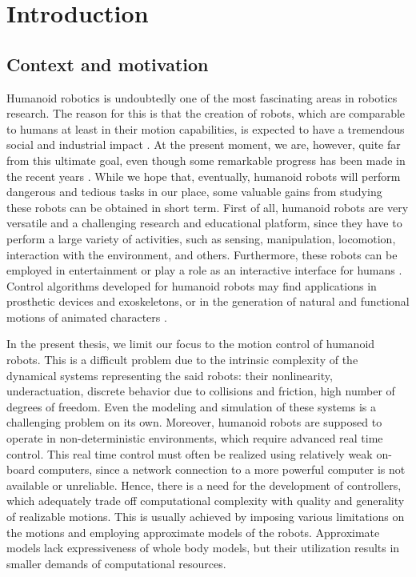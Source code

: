 \chapter{Introduction}
\label{ch.intro}
\acresetall

\section{Context and motivation}

Humanoid robotics is undoubtedly one of the most fascinating areas in robotics
research. The reason for this is that the creation of robots, which are
comparable to humans at least in their motion capabilities, is expected to have
a tremendous social and industrial impact \cite{Kemp2008handbook}. At the
present moment, we are, however, quite far from this ultimate goal, even though
some remarkable progress has been made in the recent years \cite{DRCsite}.
While we hope that, eventually, humanoid robots will perform dangerous and
tedious tasks in our place, some valuable gains from studying these robots can
be obtained in short term. First of all, humanoid robots are very versatile and
a challenging research and educational platform, since they have to perform a
large variety of activities, such as sensing, manipulation, locomotion,
interaction with the environment, and others. Furthermore, these robots can be
employed in entertainment or play a role as an interactive interface for humans
\cite{Kemp2008handbook}. Control algorithms developed for humanoid robots may
find applications in prosthetic devices and exoskeletons, or in the generation
of natural and functional motions of animated characters
\cite{VanDePanne1997cgf}.


In the present thesis, we limit our focus to the motion control of humanoid
robots. This is a difficult problem due to the intrinsic complexity of the
dynamical systems representing the said robots: their nonlinearity,
underactuation, discrete behavior due to collisions and friction, high number
of degrees of freedom. Even the modeling and simulation of these systems is a
challenging problem on its own. Moreover, humanoid robots are supposed to
operate in non-deterministic environments, which require advanced real time
control. This real time control must often be realized using relatively weak
on-board computers, since a network connection to a more powerful computer is
not available or unreliable. Hence, there is a need for the development of
controllers, which adequately trade off computational complexity with quality
and generality of realizable motions. This is usually achieved by imposing
various limitations on the motions and employing approximate models of the
robots. Approximate models lack expressiveness of whole body models, but their
utilization results in smaller demands of computational resources.


